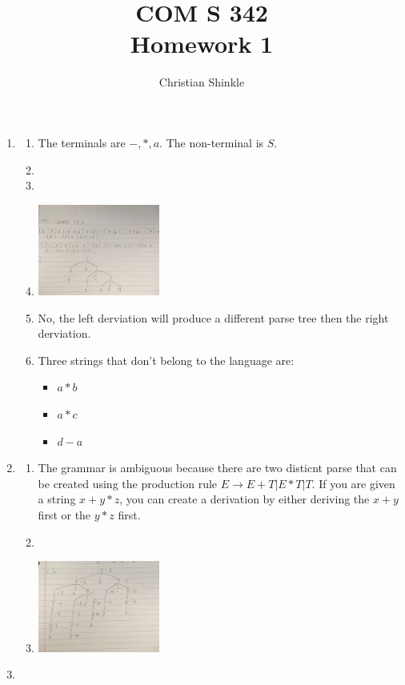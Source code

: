 \documentclass{article}
\begin{document}
 	\title{COM S 342\large \\Homework 1}
	\author{Christian Shinkle}
	\maketitle
	\begin{enumerate}
		\item 
		\begin{enumerate}
			\item The terminals are $-, *, a$. The non-terminal is $S$.
			\item 
			\item
			\item 
			\includegraphics[width=4cm]{1bcd.jpg}
			\item No, the left derviation will produce a different parse tree then the right derviation.
			\item Three strings that don't belong to the language are:
			\begin{itemize}
				\item $a*b$
				\item $a*c$
				\item $d-a$
			\end{itemize}
		\end{enumerate}
		\item 
		\begin{enumerate}
			\item The grammar is ambiguous because there are two disticnt parse that can be created using the production rule $E\rightarrow E+T|E*T|T$. If you are given a string $x+y*z$, you can create a derivation by either deriving the $x+y$ first or the $y*z$ first.
			\item
			\item \includegraphics[width=4cm]{2b.jpg}
		\end{enumerate}
		\item 

\end{enumerate}
\end{document}
